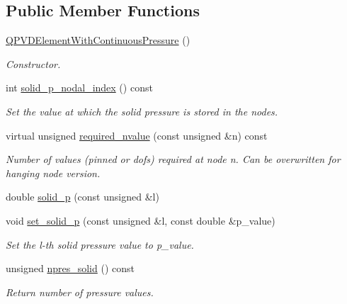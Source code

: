\subsection*{Public Member Functions}
\begin{DoxyCompactItemize}
\item 
\hyperlink{classoomph_1_1QPVDElementWithContinuousPressure_a11129d7ef7c335ccf25b06a42b6991ca}{Q\+P\+V\+D\+Element\+With\+Continuous\+Pressure} ()
\begin{DoxyCompactList}\small\item\em Constructor. \end{DoxyCompactList}\item 
int \hyperlink{classoomph_1_1QPVDElementWithContinuousPressure_aa21b5dbde38a2cfc7fa7786052267b50}{solid\+\_\+p\+\_\+nodal\+\_\+index} () const
\begin{DoxyCompactList}\small\item\em Set the value at which the solid pressure is stored in the nodes. \end{DoxyCompactList}\item 
virtual unsigned \hyperlink{classoomph_1_1QPVDElementWithContinuousPressure_a58a49882b5db5b044017f0a35bb41241}{required\+\_\+nvalue} (const unsigned \&n) const
\begin{DoxyCompactList}\small\item\em Number of values (pinned or dofs) required at node n. Can be overwritten for hanging node version. \end{DoxyCompactList}\item 
double \hyperlink{classoomph_1_1QPVDElementWithContinuousPressure_a28df8e859a4201842857e6ad7dbc7ecd}{solid\+\_\+p} (const unsigned \&l)
\item 
void \hyperlink{classoomph_1_1QPVDElementWithContinuousPressure_a796553fe8e806158167c598e4c85596f}{set\+\_\+solid\+\_\+p} (const unsigned \&l, const double \&p\+\_\+value)
\begin{DoxyCompactList}\small\item\em Set the l-\/th solid pressure value to p\+\_\+value. \end{DoxyCompactList}\item 
unsigned \hyperlink{classoomph_1_1QPVDElementWithContinuousPressure_a8d5ddf65d4462205dc889af7ba10c527}{npres\+\_\+solid} () const
\begin{DoxyCompactList}\small\item\em Return number of pressure values. \end{DoxyCompactList}\item 

\end{DoxyCompactItemize}

